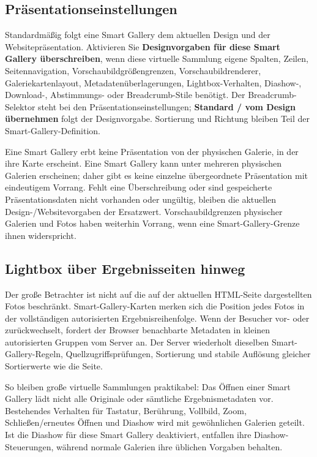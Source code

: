 \documentclass[11pt,a4paper]{article}
\newcommand{\ui}[1]{\textbf{#1}}
\begin{document}
\subsection{Präsentationseinstellungen}

Standardmäßig folgt eine Smart Gallery dem aktuellen Design und der
Websitepräsentation. Aktivieren Sie \ui{Designvorgaben für diese Smart Gallery
überschreiben}, wenn diese virtuelle Sammlung eigene Spalten, Zeilen,
Seitennavigation, Vorschaubildgrößengrenzen, Vorschaubildrenderer,
Galeriekartenlayout, Metadatenüberlagerungen, Lightbox-Verhalten, Diashow-,
Download-, Abstimmungs- oder Breadcrumb-Stile benötigt. Der Breadcrumb-Selektor
steht bei den Präsentationseinstellungen; \ui{Standard / vom Design übernehmen}
folgt der Designvorgabe. Sortierung und Richtung bleiben Teil der
Smart-Gallery-Definition.

Eine Smart Gallery erbt keine Präsentation von der physischen Galerie, in der
ihre Karte erscheint. Eine Smart Gallery kann unter mehreren physischen Galerien
erscheinen; daher gibt es keine einzelne übergeordnete Präsentation mit
eindeutigem Vorrang. Fehlt eine Überschreibung oder sind gespeicherte
Präsentationsdaten nicht vorhanden oder ungültig, bleiben die aktuellen
Design-/Websitevorgaben der Ersatzwert. Vorschaubildgrenzen physischer Galerien
und Fotos haben weiterhin Vorrang, wenn eine Smart-Gallery-Grenze ihnen
widerspricht.

\subsection{Lightbox über Ergebnisseiten hinweg}

Der große Betrachter ist nicht auf die auf der aktuellen HTML-Seite
dargestellten Fotos beschränkt. Smart-Gallery-Karten merken sich die Position
jedes Fotos in der vollständigen autorisierten Ergebnisreihenfolge. Wenn der
Besucher vor- oder zurückwechselt, fordert der Browser benachbarte Metadaten in
kleinen autorisierten Gruppen vom Server an. Der Server wiederholt dieselben
Smart-Gallery-Regeln, Quellzugriffsprüfungen, Sortierung und stabile Auflösung
gleicher Sortierwerte wie die Seite.

So bleiben große virtuelle Sammlungen praktikabel: Das Öffnen einer Smart
Gallery lädt nicht alle Originale oder sämtliche Ergebnismetadaten vor.
Bestehendes Verhalten für Tastatur, Berührung, Vollbild, Zoom,
Schließen/erneutes Öffnen und Diashow wird mit gewöhnlichen Galerien geteilt.
Ist die Diashow für diese Smart Gallery deaktiviert, entfallen ihre
Diashow-Steuerungen, während normale Galerien ihre üblichen Vorgaben behalten.
\end{document}
